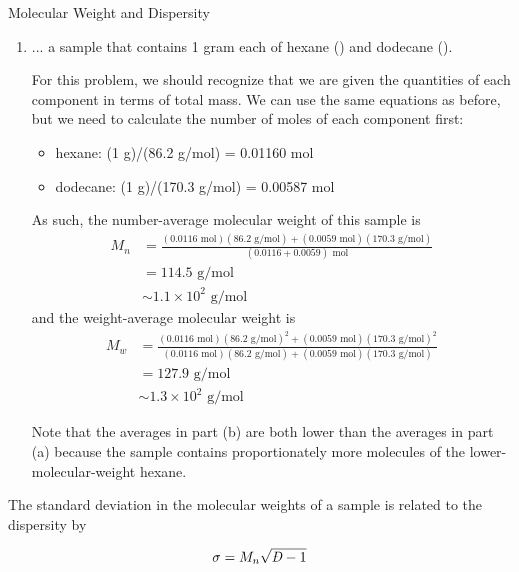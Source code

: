 \begin{activity}{Molecular Weight and Dispersity}
\begin{exercises}
\begin{enumerate}
				\item ... a sample that contains 1 gram each of hexane () and dodecane ().
					
					\begin{solution}{}
						For this problem, we should recognize that we are given the quantities of each component in terms of total mass.  We can use the same equations as before, but we need to calculate the number of moles of each component first:
						
						\begin{itemize}
							\item hexane: (1 g)/(86.2 g/mol) = 0.01160 mol
							\item dodecane: (1 g)/(170.3 g/mol) = 0.00587 mol
						\end{itemize}
						
						As such, the number-average molecular weight of this sample is
						\begin{align*}
							M_n &= \frac{(0.0116\text{ mol})(86.2\text{ g/mol})+(0.0059\text{ mol})(170.3\text{ g/mol})}{(0.0116+0.0059)\text{ mol}} \\
								&= 114.5\text{ g/mol}\\
								&\sim 1.1\times 10^2\text{ g/mol}
						\end{align*}
						and the weight-average molecular weight is
						\begin{align*}
							M_w &= \frac{(0.0116\text{ mol})(86.2\text{ g/mol})^2+(0.0059\text{ mol})(170.3\text{ g/mol})^2}{(0.0116\text{ mol})(86.2\text{ g/mol})+(0.0059\text{ mol})(170.3\text{ g/mol})} \\
								&= 127.9\text{ g/mol}\\
								&\sim 1.3\times 10^2\text{ g/mol}
						\end{align*}
						
						Note that the averages in part (b) are both lower than the averages in part (a) because the sample contains proportionately more molecules of the lower-molecular-weight hexane.
					\end{solution}
				
			\end{enumerate}
			
		\exercise The standard deviation in the molecular weights of a sample is related to the dispersity by
		
			\begin{align*}
					\sigma = M_n\sqrt{\PDImath - 1}
			\end{align*}
			

\end{exercises}
\end{activity}

